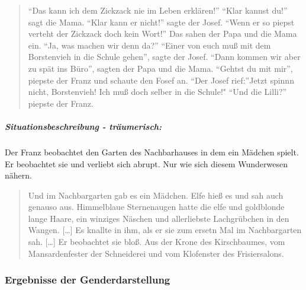 \begin{quote}
``Das kann ich dem Zickzack nie im Leben erklären!'' ``Klar kannst du!''
sagt die Mama. ``Klar kann er nicht!'' sagte der Josef. ``Wenn er so
piepst verteht der Zickzack doch kein Wort!'' Das sahen der Papa und die
Mama ein. ``Ja, was machen wir denn da?'' ``Einer von euch muß mit dem
Borstenvieh in die Schule gehen'', sagte der Josef. ``Dann kommen wir
aber zu spät ins Büro'', sagten der Papa und die Mama. ``Gehtst du mit
mir'', piepste der Franz und schaute den Fosef an. ``Der Josef
rief:''Jetzt spinnn nicht, Borstenvieh! Ich muß doch selber in die
Schule!" ``Und die Lilli?'' piepste der Franz.
\end{quote}

\subparagraph{Situationsbeschreibung - träumerisch:}

Der Franz beobachtet den Garten des Nachbarhauses in dem ein Mädchen
spielt. Er beobachtet sie und verliebt sich abrupt. Nur wie sich diesem
Wunderwesen nähern.

\begin{quote}
Und im Nachbargarten gab es ein Mädchen. Elfe hieß es und sah auch
genauso aus. Himmelblaue Sternenaugen hatte die elfe und goldblonde
lange Haare, ein winziges Näschen und allerliebste Lachgrübchen in den
Wangen. {[}\ldots{}{]} Es knallte in ihm, als er sie zum ersetn Mal im
Nachbargarten sah. {[}\ldots{}{]} Er beobachtet sie bloß. Aus der Krone
des Kirschbaumes, vom Mansardenfester der Schneiderei und vom Klofenster
des Frisiersalons.
\end{quote}

\subsubsection{Ergebnisse der Genderdarstellung}

